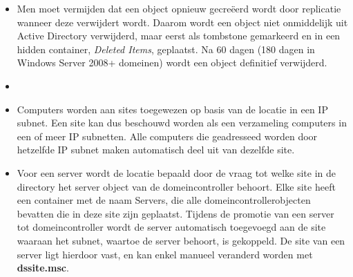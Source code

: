 \documentclass{report}
\begin{document}
\begin{enumerate}
{\begin{itemize}
				\item Men moet vermijden dat een object opnieuw gecreëerd wordt door replicatie wanneer deze verwijdert wordt. Daarom wordt een object niet onmiddelijk uit Active Directory verwijderd, maar eerst als tombstone gemarkeerd en in een hidden container, \textit{Deleted Items}, geplaatst. Na 60 dagen (180 dagen in Windows Server 2008+ domeinen) wordt een object definitief verwijderd. 
			\end{itemize}
		}
		
		 {
			\begin{itemize}
				\item {}
			\end{itemize}

		}
		
		 { }
		
		 { 
			\begin{itemize}
				\item Computers worden aan sites toegewezen op basis van de locatie in een IP subnet. Een site kan dus beschouwd worden als een verzameling computers in een of meer IP subnetten. Alle computers die geadresseed worden door hetzelfde IP subnet maken automatisch deel uit van dezelfde site.
				\item Voor een server wordt de locatie bepaald door de vraag tot welke site in de directory het server object van de domeincontroller behoort. Elke site heeft een container met de naam Servers, die alle domeincontrollerobjecten bevatten die in deze site zijn geplaatst. Tijdens de promotie van een server tot domeincontroller wordt de server automatisch toegevoegd aan de site waaraan het subnet, waartoe de server behoort, is gekoppeld. De site van een server ligt hierdoor vast, en kan enkel manueel veranderd worden met \textbf{dssite.msc}.
			\end{itemize}
		}
	\end{enumerate}
	
\end{document}
